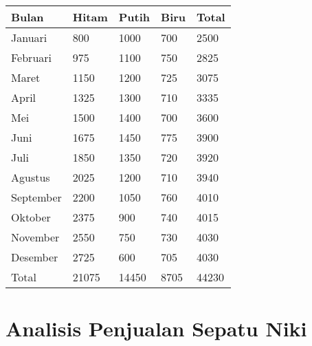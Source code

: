 \documentclass[letterpaper,11pt]{article}
\begin{document}
  \begin{table}[ht]
      \centering
      \small 
      \begin{tabu}{*{5}{X[c]}}
          \toprule
          Bulan & Hitam & Putih & Biru & Total \\
          \midrule
          Januari & 800 & 1000 & 700 & 2500 \\
          Februari & 975 & 1100 & 750 & 2825 \\
          Maret & 1150 & 1200 & 725 & 3075 \\
          April & 1325 & 1300 & 710 & 3335 \\
          Mei & 1500 & 1400 & 700 & 3600 \\
          Juni & 1675 & 1450 & 775 & 3900 \\
          Juli & 1850 & 1350 & 720 & 3920 \\
          Agustus & 2025 & 1200 & 710 & 3940 \\
          September & 2200 & 1050 & 760 & 4010 \\
          Oktober & 2375 & 900 & 740 & 4015 \\
          November & 2550 & 750 & 730 & 4030 \\
          Desember & 2725 & 600 & 705 & 4030 \\
          \bottomrule
          Total & 21075 & 14450 & 8705 & 44230\\
        \end{tabu}
  \end{table}
  
\section{Analisis Penjualan Sepatu Niki}
\end{document}
